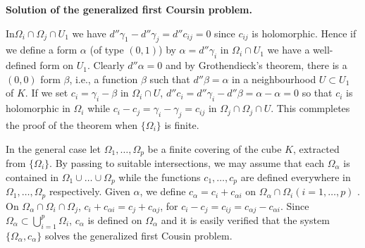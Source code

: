 \begin{step}\label{chap8:step2}
\textbf{Solution of the generalized first Coursin
    problem.} 

In\pageoriginale $\Omega_i \cap \Omega_j \cap  U_1$ we have
$d''\gamma_1 - d'' 
\gamma_j = d''c_{ij} = 0$ since $c_{ij}$ is holomorphic. Hence if we
define a form $\alpha$ (of type $(0,1)$) by $\alpha = d'' \gamma _i $
in $\Omega_i \cap U_1$ we have a well-defined form on $U_1$. Clearly
$d'' \alpha =0$ and by Grothendieck's theorem, there is a $(0,0)$ form
$\beta$, i.e., a function $\beta$ such that $d'' \beta = \alpha$ in a
neighbourhood $U \subset U_1$ of $K$. If we set $c_i =\gamma_i -\beta$
in $\Omega_i \cap U$, $d'' c_i = d'' \gamma_i - d'' \beta = \alpha -
\alpha =0$ so that $c_i$ is holomorphic in $\Omega_i$ while $c_i - c_j
= \gamma_i - \gamma_j = c_{ij}$ in $\Omega_j \cap \Omega_j \cap
U$. This commpletes the proof of the theorem when $\{\Omega_i\}$ is
finite. 
\end{step}

In the general case let $\Omega_1, \ldots, \Omega_p$ be a finite
covering of the cube $K$, extracted from $\{\Omega_i\}$. By passing to
suitable intersections, we may assume that each $\Omega_\alpha$ is
contained in $\Omega_1 \cup \ldots \cup \Omega_p $ while the functions
$c_1, \ldots, c_p$ are defined everywhere in $\Omega_1, \ldots,
\Omega_p$ respectively. Given $\alpha$, we define $c_\alpha = c_i +
c_{\alpha i}$ on $\Omega_\alpha \cap \Omega_i (i = 1, \ldots, p)$ . On
$\Omega_\alpha \cap \Omega_i \cap \Omega_j$, $c_i + c_{\alpha i} = c_j
+ c_{\alpha j}$, for $c_i - c_j = c_{ij} = c_{\alpha j} - c_{\alpha
  i}$. Since $\Omega_\alpha \subset \bigcup\limits^p_{i=1} \Omega_i$,
$c_{\alpha}$ is defined on $\Omega_\alpha$ and it is easily verified
that the system $\{\Omega_\alpha, c_\alpha\}$ solves the generalized
first Cousin problem. 



